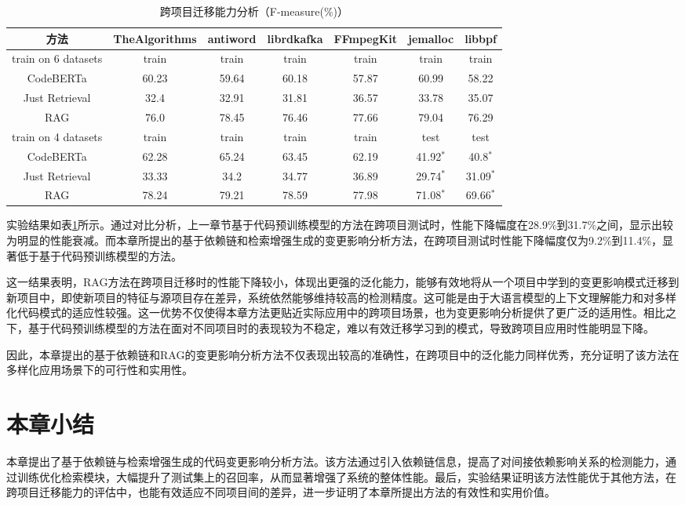 \begin{table}[htbp]
\caption{跨项目迁移能力分析（F-measure(\%)）}
\label{2_跨项目迁移能力分析}
\vspace{0.5em}\centering\wuhao
\begin{tabular}{c|cccc|cc}
\toprule
方法& TheAlgorithms & antiword & librdkafka & FFmpegKit & jemalloc & libbpf\\
\midrule
train on 6 datasets & train &train &train &train &train &train \\
\midrule
CodeBERTa  &  60.23 & 59.64 & 60.18 & 57.87 & 60.99 & 58.22 \\
Just Retrieval   & 32.4 & 32.91 & 31.81 & 36.57 & 33.78 & 35.07  \\
RAG & 76.0 & 78.45 & 76.46 & 77.66 & 79.04 & 76.29  \\
\midrule
train on 4 datasets & train &train &train &train &test &test\\
\midrule
CodeBERTa  &  62.28 & 65.24 & 63.45 & 62.19 & 41.92$^*$ & 40.8$^*$\\
Just Retrieval   & 33.33 & 34.2 & 34.77 & 36.89 & 29.74$^*$ & 31.09$^*$ \\
RAG & 78.24 & 79.21 & 78.59 & 77.98 & 71.08$^*$ & 69.66$^*$ \\
\bottomrule
\end{tabular}
\end{table}

实验结果如表\ref{2_跨项目迁移能力分析}所示。通过对比分析，上一章节基于代码预训练模型的方法在跨项目测试时，性能下降幅度在28.9\%到31.7\%之间，显示出较为明显的性能衰减。而本章所提出的基于依赖链和检索增强生成的变更影响分析方法，在跨项目测试时性能下降幅度仅为9.2\%到11.4\%，显著低于基于代码预训练模型的方法。

这一结果表明，RAG方法在跨项目迁移时的性能下降较小，体现出更强的泛化能力，能够有效地将从一个项目中学到的变更影响模式迁移到新项目中，即使新项目的特征与源项目存在差异，系统依然能够维持较高的检测精度。这可能是由于大语言模型的上下文理解能力和对多样化代码模式的适应性较强。这一优势不仅使得本章方法更贴近实际应用中的跨项目场景，也为变更影响分析提供了更广泛的适用性。相比之下，基于代码预训练模型的方法在面对不同项目时的表现较为不稳定，难以有效迁移学习到的模式，导致跨项目应用时性能明显下降。


因此，本章提出的基于依赖链和RAG的变更影响分析方法不仅表现出较高的准确性，在跨项目中的泛化能力同样优秀，充分证明了该方法在多样化应用场景下的可行性和实用性。
 

\section{本章小结}

本章提出了基于依赖链与检索增强生成的代码变更影响分析方法。该方法通过引入依赖链信息，提高了对间接依赖影响关系的检测能力，通过训练优化检索模块，大幅提升了测试集上的召回率，从而显著增强了系统的整体性能。最后，实验结果证明该方法性能优于其他方法，在跨项目迁移能力的评估中，也能有效适应不同项目间的差异，进一步证明了本章所提出方法的有效性和实用价值。


